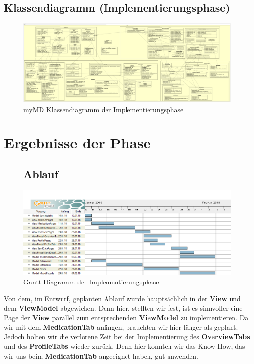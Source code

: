 \documentclass[a4paper]{scrreprt}
\begin{document}
\section{Klassendiagramm (Implementierungsphase)}
\begin{figure}[H]
\hspace{-1.8cm}
\begin{minipage}[c]{\textwidth}
\centering
\includegraphics[width=1.7\textwidth, angle=90]{graphics/Klassendiagramme/myMDImplementierung}
\caption{myMD Klassendiagramm der Implementierungsphase}
\end{minipage}
\end{figure}

\chapter{Ergebnisse der Phase}
\begin{figure}[H]
\section{Ablauf}
\begin{minipage}[c]{\textwidth}
\centering
\includegraphics[width=0.95\textheight, angle=90]{Gantt/GanttDiagrammImplementierung}
\caption{Gantt Diagramm der Implementierungsphase}
\end{minipage}
\end{figure}
Von dem, im Entwurf, geplanten Ablauf wurde hauptsächlich in der \textbf{View} und dem \textbf{ViewModel} abgewichen. Denn hier, stellten wir fest, ist es sinnvoller eine Page der \textbf{View} parallel zum entsprechenden \textbf{ViewModel} zu implementieren. Da wir mit dem \textbf{MedicationTab} anfingen, brauchten wir hier länger als geplant. Jedoch holten wir die verlorene Zeit bei der Implementierung des \textbf{OverviewTabs} und des \textbf{ProfileTabs} wieder zurück. Denn hier konnten wir das Know-How, das wir uns beim \textbf{MedicationTab} angeeignet haben, gut anwenden.
\end{document}
